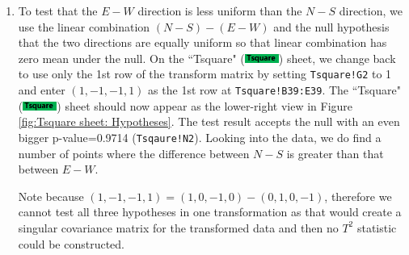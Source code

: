 \documentclass[article]{jss}
\numberwithin{equation}{subsection}
\newcommand{\shtTsquare}{``Tsquare" (\includegraphics[height=8pt, keepaspectratio=true]{TsquareSheetTab_png}) }
\begin{document}
\begin{enumerate}
        	\begin{figure}[!tbh]
        		\includegraphics[width=90pt,keepaspectratio=true]{img/Cov2Correl_PlotCov}
        		\vspace{-10pt}\centering\protect\caption{Cov2Correl sheet: Covariance plot of the transformed responses.}\label{fig:Cov2Correl_PlotCov}
        	\end{figure}
        	
        	
        	Now we see that the covariance is elongated along the positive sloped direction, making it possible that the mean vector (\texttt{0.857142857, 0.928571429}), displayed at range \texttt{Tsquare!L5:L6}, has a smaller Mahalanobis distance from the center than both its projections on the two standard basis coordinates. This is a version of the Stein paradox (\cite{SteinCM1956InadmissibilityoftheUsualEstima}, \cite{CasellaHwang2012}). In the case here it can be understood as that the two hypotheses mutually corroborate. The data has indicated that it is more natural to have $N=S$ and $E=W$ happening together than separately; it is rather strange to observe uniformity in only one of the directions but not in the other. The corroboration effect would not have been captured had we been testing only univariate procedures.
        	
        	
        	\item To test that the $E-W$ direction is less uniform than the $N-S$ direction, we use the linear combination $(N-S)-(E-W)$ and the null hypothesis that the two directions are equally uniform so that linear combination has zero mean under the null. On the \shtTsquare sheet, we change back to use only the 1st row of the transform matrix by setting \texttt{Tsquare!G2} to 1 and enter $(1,-1,-1,1)$ as the 1st row at \texttt{Tsquare!B39:E39}. The \shtTsquare sheet should now appear as the lower-right view in Figure \ref{fig:Tsquare sheet: Hypotheses}. The test result accepts the null with an even bigger p-value=0.9714 (\texttt{Tsqaure!N2}). Looking into the data, we do find a number of points where the difference between $N-S$ is greater than that between $E-W$.
        	
        	
        	Note because $(1,-1,-1,1) = (1,0,-1,0) - (0,1,0,-1)$, therefore we cannot test all three hypotheses in one transformation as that would create a singular covariance matrix for the transformed data and then no $T^2$ statistic could be constructed.
        	
        \end{enumerate}
        
\end{document}
